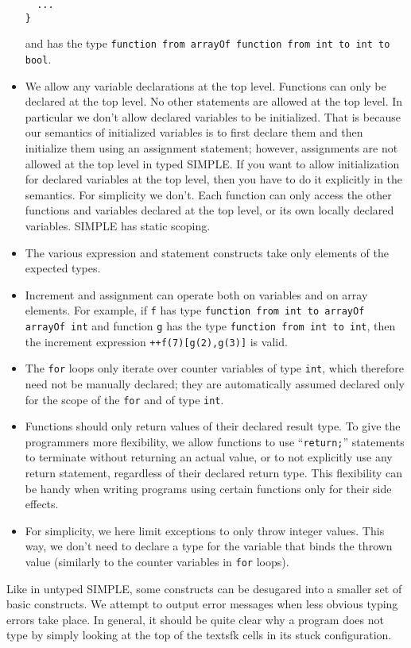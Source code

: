 \begin{kblock}[text]
\begin{itemize}
\begin{verbatim}
  ...
}
\end{verbatim}
and has the type
\texttt{function from arrayOf function from int to int to bool}.
\item We allow any variable declarations at the top level.  Functions
can only be declared at the top level.  No other statements are
allowed at the top level.  In particular we don't allow declared
variables to be initialized. That is because our semantics of
initialized variables is to first declare them and then initialize
them using an assignment statement; however, assignments are not
allowed at the top level in typed SIMPLE.  If you want to allow
initialization for declared variables at the top level, then you have
to do it explicitly in the semantics.  For simplicity we don't.
Each function can only access the other functions and variables
declared at the top level, or its own locally declared variables.
SIMPLE has static scoping.
\item The various expression and statement constructs take only
elements of the expected types.
\item Increment and assignment can operate both on variables and on
array elements.  For example, if \texttt{f} has type
\texttt{function from int to arrayOf arrayOf int} and function
\texttt{g} has the type \texttt{function from int to int}, then the
increment expression \texttt{++f(7)[g(2),g(3)]} is valid.
\item The \texttt{for} loops only iterate over counter variables of
type \texttt{int}, which therefore need not be manually declared; they
are automatically assumed declared only for the scope of the
\texttt{for} and of type \texttt{int}.
\item Functions should only return values of their declared result
type.  To give the programmers more flexibility, we allow functions to
use ``\texttt{return;}'' statements to terminate without returning an
actual value, or to not explicitly use any return statement,
regardless of their declared return type.  This flexibility can be
handy when writing programs using certain functions only for their
side effects.
\item For simplicity, we here limit exceptions to only throw integer
values.  This way, we don't need to declare a type for the variable
that binds the thrown value (similarly to the counter variables in
\texttt{for} loops).
\end{itemize}
Like in untyped SIMPLE, some constructs can be desugared into a
smaller set of basic constructs.  We attempt to output error messages
when less obvious typing errors take place.  In general, it should be
quite clear why a program does not type by simply looking at the top
of the textsf{k} cells in its stuck configuration.

\end{kblock}

\vspace*{3ex}
